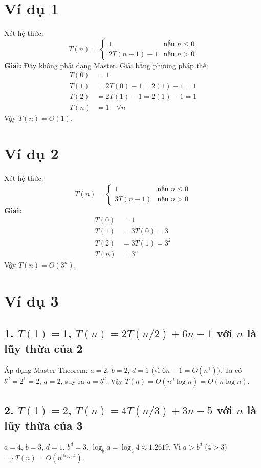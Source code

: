 \documentclass{article}
\begin{document}
\section*{Ví dụ 1}
Xét hệ thức:
\[
T(n) = 
\begin{cases}
1 & \text{nếu } n \le 0 \\
2T(n-1) - 1 & \text{nếu } n > 0
\end{cases}
\]
\textbf{Giải:} Đây không phải dạng Master. Giải bằng phương pháp thế:
\begin{align*}
T(0) &= 1 \\
T(1) &= 2T(0) - 1 = 2(1) - 1 = 1 \\
T(2) &= 2T(1) - 1 = 2(1) - 1 = 1 \\
T(n) &= 1 \quad \forall n
\end{align*}
Vậy $T(n) = O(1)$.

\section*{Ví dụ 2}
Xét hệ thức:
\[
T(n) = 
\begin{cases}
1 & \text{nếu } n \le 0 \\
3T(n-1) & \text{nếu } n > 0
\end{cases}
\]
\textbf{Giải:}
\begin{align*}
T(0) &= 1 \\
T(1) &= 3T(0) = 3 \\
T(2) &= 3T(1) = 3^2 \\
T(n) &= 3^n
\end{align*}
Vậy $T(n) = O(3^n)$.

\section*{Ví dụ 3}
\subsection*{1. $T(1) = 1$, $T(n) = 2T(n/2) + 6n - 1$ với $n$ là lũy thừa của 2}
Áp dụng Master Theorem: $a=2$, $b=2$, $d=1$ (vì $6n-1 = O(n^1)$).
Ta có $b^d = 2^1 = 2$, $a = 2$, suy ra $a = b^d$.
Vậy $T(n) = O(n^d \log n) = O(n \log n)$.

\subsection*{2. $T(1) = 2$, $T(n) = 4T(n/3) + 3n - 5$ với $n$ là lũy thừa của 3}
$a=4$, $b=3$, $d=1$.
$b^d = 3$, $\log_b a = \log_3 4 \approx 1.2619$.
Vì $a > b^d$ ($4 > 3$) $\Rightarrow T(n) = O(n^{\log_3 4})$.
\end{document}
